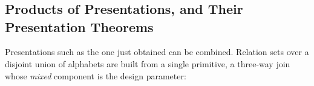 \begin{code}[hide]
\AgdaSpace{}%
\AgdaSpace{}%
\AgdaSpace{}%
\<%
\\
%
\>[2]\AgdaSpace{}%
\AgdaSymbol{:}\AgdaSpace{}%
\AgdaSpace{}%
\AgdaSpace{}%
\<%
\\
%
\>[2]\AgdaSpace{}%
\AgdaSymbol{:}\AgdaSpace{}%
\AgdaSpace{}%
\AgdaSpace{}%
\AgdaSpace{}%
\AgdaSpace{}%
\<%
\\
%
\>[2]\AgdaSpace{}%
\AgdaSymbol{:}\AgdaSpace{}%
\AgdaSpace{}%
\AgdaSpace{}%
\AgdaSpace{}%
\AgdaSpace{}%
\<%
\end{code}
\subsection{Products of Presentations, and Their Presentation Theorems}\label{sec:constructions}

Presentations such as the one just obtained can be combined.  Relation
sets over a disjoint union of alphabets are built from a single
primitive, a three-way join whose \emph{mixed} component is the design
parameter:

